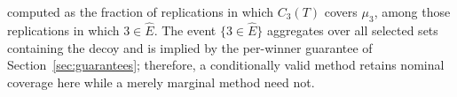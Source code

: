 \documentclass[12pt]{article}
\newcommand{\Ehat}{\widehat{E}}
\begin{document}
\begin{appendices}
\begin{enumerate}[leftmargin=*]
\[\]
computed as the fraction of replications in which $C_3(T)$ covers $\mu_3$, among those
replications in which $3\in\Ehat$. The event $\{3\in\Ehat\}$ aggregates over all selected
sets containing the decoy and is implied by the per-winner guarantee of
Section~\ref{sec:guarantees}; therefore, a conditionally valid method retains nominal coverage
here while a merely marginal method need not.




\end{enumerate}
\end{appendices}
\end{document}
